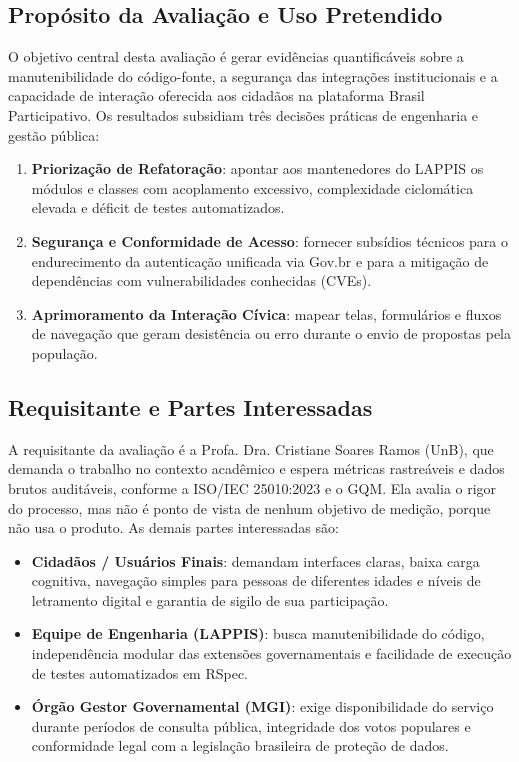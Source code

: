\documentclass[journal]{IEEEtran}
\begin{document}
\subsection{Propósito da Avaliação e Uso Pretendido}
\label{sec:proposito}

O objetivo central desta avaliação é gerar evidências quantificáveis sobre a manutenibilidade do código-fonte, a segurança das integrações institucionais e a capacidade de interação oferecida aos cidadãos na plataforma Brasil Participativo. Os resultados subsidiam três decisões práticas de engenharia e gestão pública:

\begin{enumerate}
    \item \textbf{Priorização de Refatoração}: apontar aos mantenedores do LAPPIS os módulos e classes com acoplamento excessivo, complexidade ciclomática elevada e déficit de testes automatizados.
    \item \textbf{Segurança e Conformidade de Acesso}: fornecer subsídios técnicos para o endurecimento da autenticação unificada via Gov.br e para a mitigação de dependências com vulnerabilidades conhecidas (CVEs).
    \item \textbf{Aprimoramento da Interação Cívica}: mapear telas, formulários e fluxos de navegação que geram desistência ou erro durante o envio de propostas pela população.
\end{enumerate}

\subsection{Requisitante e Partes Interessadas}
\label{sec:stakeholders}

A requisitante da avaliação é a Profa. Dra. Cristiane Soares Ramos (UnB), que demanda o trabalho no contexto acadêmico e espera métricas rastreáveis e dados brutos auditáveis, conforme a ISO/IEC 25010:2023 e o GQM. Ela avalia o rigor do processo, mas não é ponto de vista de nenhum objetivo de medição, porque não usa o produto. As demais partes interessadas são:

\begin{itemize}
    \item \textbf{Cidadãos / Usuários Finais}: demandam interfaces claras, baixa carga cognitiva, navegação simples para pessoas de diferentes idades e níveis de letramento digital e garantia de sigilo de sua participação.
    \item \textbf{Equipe de Engenharia (LAPPIS)}: busca manutenibilidade do código, independência modular das extensões governamentais e facilidade de execução de testes automatizados em RSpec.
    \item \textbf{Órgão Gestor Governamental (MGI)}: exige disponibilidade do serviço durante períodos de consulta pública, integridade dos votos populares e conformidade legal com a legislação brasileira de proteção de dados.
\end{itemize}
\end{document}
